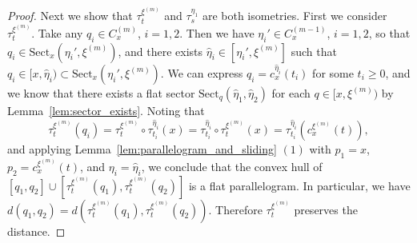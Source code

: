 \documentclass[12pt]{amsart}
\numberwithin{equation}{section}
\theoremstyle{plain}
\theoremstyle{definition}
\theoremstyle{remark}
\newcommand{\xxi}[1]{\xi^{(#1)}}
\newcommand{\ray}[1]{[#1)}
\newcommand{\cc}[2]{c_{#1}^{#2}}
\newcommand{\trans}[2]{\tau_{#1}^{#2}}
\newcommand{\sect}[3][]{\mathrm{Sect}_{#1}(#2,#3)}
\newcommand{\cone}[2][]{C_{#1}^{(#2)}}
\begin{document}
\begin{proof}
 Next we show that $\trans{t}{\xxi{m}}$ and $\trans{s}{\eta_1}$ are
 both isometries. 
 First we consider $\trans{t}{\xxi{m}}$.
 Take any $q_i \in \cone[x]{m}$, $i=1,2$. 
 Then we have $\eta_i' \in \cone[x]{m-1}$, $i=1,2$, so that 
 $q_i \in \sect[x]{\eta_i'}{\xxi{m}}$, and there exists
 $\hat \eta_i \in [\eta_i',\xxi{m}]$ such that 
 $q_i \in \ray{x,\hat \eta_i} \subset
 \sect[x]{\eta_i'}{\xxi{m}}$. 
 We can express $q_i=\cc{x}{\hat \eta_i}(t_i)$ for some $t_i\geq 0$, and
 we know that there exists a flat sector
 $\sect[q]{\hat \eta_1}{\hat \eta_2}$ for each 
 $q \in \ray{x, \xxi{m}}$ by Lemma~\ref{lem:sector_exists}. 
 Noting that 
 \begin{equation*}
 \trans{t}{\xxi{m}}(q_i)=
 \trans{t}{\xxi{m}}\circ \trans{t_i}{\hat \eta_i}(x)
 =\trans{t_i}{\hat \eta_i}\circ \trans{t}{\xxi{m}}(x)
 =\trans{t_i}{\hat \eta_i}(\cc{x}{\xxi{m}}(t)), 
 \end{equation*}
 and applying Lemma~\ref{lem:parallelogram_and_sliding} $(1)$
 with  $p_1=x$, $p_2=\cc{x}{\xxi{m}}(t)$, and 
 $\eta_i=\hat \eta_i$, 
 we conclude that the convex hull of 
 $[q_1,q_2]\cup [\trans{t}{\xxi{m}}(q_1), \trans{t}{\xxi{m}}(q_2)]$
 is a flat parallelogram. 
 In particular, we have 
 $d(q_1, q_2)=d(\trans{t}{\xxi{m}}(q_1),\trans{t}{\xxi{m}}(q_2))$. 
 Therefore $\trans{t}{\xxi{m}}$ preserves the distance. 


\end{proof}
\end{document}
